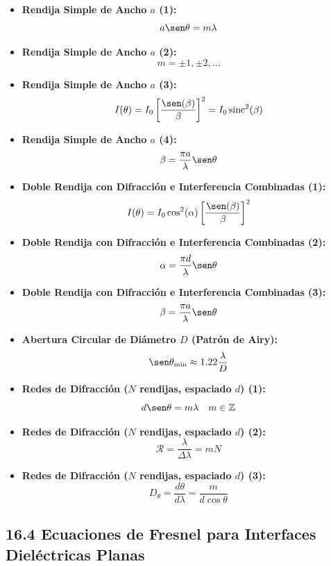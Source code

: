 \documentclass[11pt,a4paper]{article}
\begin{document}
\begin{itemize}
  \item \textbf{Rendija Simple de Ancho $a$ (1):}
  \[
    a \sen\theta = m \lambda
  \]
  \item \textbf{Rendija Simple de Ancho $a$ (2):}
  \[
    m = \pm 1, \pm 2, \dots
  \]
  \item \textbf{Rendija Simple de Ancho $a$ (3):}
  \[
    I(\theta) = I_0 \left[ \frac{\sen(\beta)}{\beta} \right]^2 = I_0 \operatorname{sinc}^2(\beta)
  \]
  \item \textbf{Rendija Simple de Ancho $a$ (4):}
  \[
    \beta = \frac{\pi a}{\lambda}\sen\theta
  \]
  \item \textbf{Doble Rendija con Difracción e Interferencia Combinadas (1):}
  \[
    I(\theta) = I_0 \cos^2(\alpha) \left[ \frac{\sen(\beta)}{\beta} \right]^2
  \]
  \item \textbf{Doble Rendija con Difracción e Interferencia Combinadas (2):}
  \[
    \alpha = \frac{\pi d}{\lambda}\sen\theta
  \]
  \item \textbf{Doble Rendija con Difracción e Interferencia Combinadas (3):}
  \[
    \beta = \frac{\pi a}{\lambda}\sen\theta
  \]
  \item \textbf{Abertura Circular de Diámetro $D$ (Patrón de Airy):}
  \[
    \sen\theta_{\min} \approx 1.22 \frac{\lambda}{D}
  \]
  \item \textbf{Redes de Difracción ($N$ rendijas, espaciado $d$) (1):}
  \[
    d \sen\theta = m \lambda \quad m \in \mathbb{Z}
  \]
  \item \textbf{Redes de Difracción ($N$ rendijas, espaciado $d$) (2):}
  \[
    \mathcal{R} = \frac{\lambda}{\Delta\lambda} = m N
  \]
  \item \textbf{Redes de Difracción ($N$ rendijas, espaciado $d$) (3):}
  \[
    D_\theta = \frac{d\theta}{d\lambda} = \frac{m}{d \cos\theta}
  \]
\end{itemize}

\subsection*{16.4 Ecuaciones de Fresnel para Interfaces Dieléctricas Planas}
\end{document}
